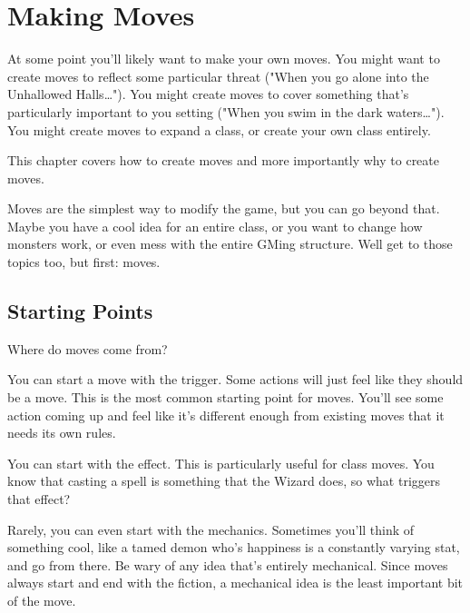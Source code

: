 \chapter{Making Moves}
  
 



At some point you'll likely want to make your own moves. You might want to create moves to reflect some particular threat ("When you go alone into the Unhallowed Halls…"). You might create moves to cover something that's particularly important to you setting ("When you swim in the dark waters…"). You might create moves to expand a class, or create your own class entirely.

 

This chapter covers how to create moves and more importantly why to create moves.

 

Moves are the simplest way to modify the game, but you can go beyond that. Maybe you have a cool idea for an entire class, or you want to change how monsters work, or even mess with the entire GMing structure. Well get to those topics too, but first: moves.

 
\section{Starting Points}   
 

Where do moves come from?

 

You can start a move with the trigger. Some actions will just feel like they should be a move. This is the most common starting point for moves. You'll see some action coming up and feel like it's different enough from existing moves that it needs its own rules.

 

You can start with the effect. This is particularly useful for class moves. You know that casting a spell is something that the Wizard does, so what triggers that effect?

 

Rarely, you can even start with the mechanics. Sometimes you'll think of something cool, like a tamed demon who's happiness is a constantly varying stat, and go from there. Be wary of any idea that's entirely mechanical. Since moves always start and end with the fiction, a mechanical idea is the least important bit of the move.

 

